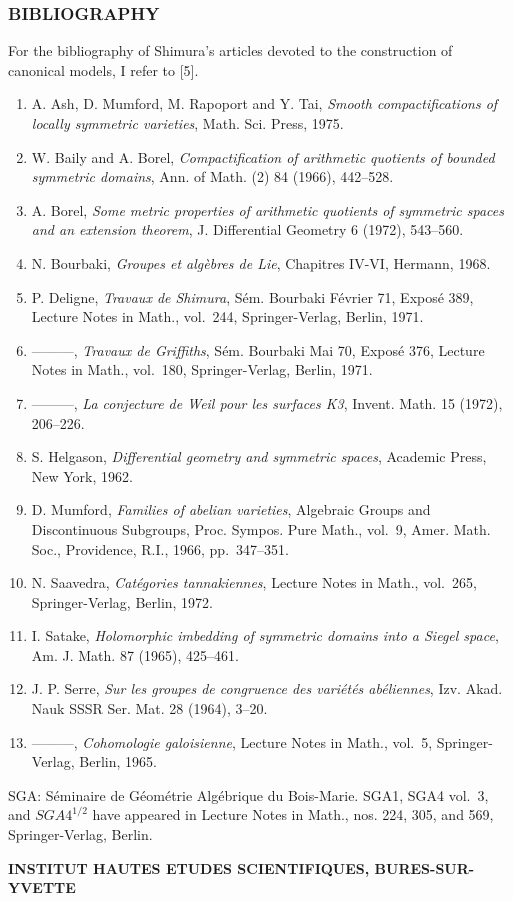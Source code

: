 \documentclass[10pt,a4paper]{article}
\providecommand{\tightlist}{\setlength{\itemsep}{0pt}\setlength{\parskip}{0pt}}
\begin{document}
\subsubsection{BIBLIOGRAPHY}

For the bibliography of Shimura's articles devoted to the construction of canonical models, I refer to {[}5{]}.

\begin{enumerate}
\def\labelenumi{\arabic{enumi}.}
\tightlist
\item
  A. Ash, D. Mumford, M. Rapoport and Y. Tai, \emph{Smooth compactifications of locally symmetric varieties}, Math. Sci. Press, 1975.
\item
  W. Baily and A. Borel, \emph{Compactification of arithmetic quotients of bounded symmetric domains}, Ann. of Math. (2) 84 (1966), 442--528.
\item
  A. Borel, \emph{Some metric properties of arithmetic quotients of symmetric spaces and an extension theorem}, J. Differential Geometry 6 (1972), 543--560.
\item
  N. Bourbaki, \emph{Groupes et algèbres de Lie}, Chapitres IV-VI, Hermann, 1968.
\item
  P. Deligne, \emph{Travaux de Shimura}, Sém. Bourbaki Février 71, Exposé 389, Lecture Notes in Math., vol.~244, Springer-Verlag, Berlin, 1971.
\item
  ---------, \emph{Travaux de Griffiths}, Sém. Bourbaki Mai 70, Exposé 376, Lecture Notes in Math., vol.~180, Springer-Verlag, Berlin, 1971.
\item
  ---------, \emph{La conjecture de Weil pour les surfaces K3}, Invent. Math. 15 (1972), 206--226.
\item
  S. Helgason, \emph{Differential geometry and symmetric spaces}, Academic Press, New York, 1962.
\item
  D. Mumford, \emph{Families of abelian varieties}, Algebraic Groups and Discontinuous Subgroups, Proc. Sympos. Pure Math., vol.~9, Amer. Math. Soc., Providence, R.I., 1966, pp.~347--351.
\item
  N. Saavedra, \emph{Catégories tannakiennes}, Lecture Notes in Math., vol.~265, Springer-Verlag, Berlin, 1972.
\item
  I. Satake, \emph{Holomorphic imbedding of symmetric domains into a Siegel space}, Am. J. Math. 87 (1965), 425--461.
\item
  J. P. Serre, \emph{Sur les groupes de congruence des variétés abéliennes}, Izv. Akad. Nauk SSSR Ser. Mat. 28 (1964), 3--20.
\item
  ---------, \emph{Cohomologie galoisienne}, Lecture Notes in Math., vol.~5, Springer-Verlag, Berlin, 1965.
\end{enumerate}

SGA: Séminaire de Géométrie Algébrique du Bois-Marie. SGA1, SGA4 vol.~3, and \(SGA4^{1/2}\) have appeared in Lecture Notes in Math., nos. 224, 305, and 569, Springer-Verlag, Berlin.

\textbf{INSTITUT HAUTES ETUDES SCIENTIFIQUES, BURES-SUR-YVETTE}
\end{document}
